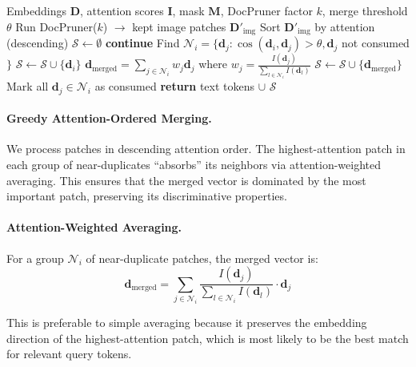 \documentclass[11pt]{article}
\begin{document}
\begin{algorithm}[t]
\caption{DP-PostMerge}
\begin{algorithmic}[1]
\REQUIRE Embeddings $\mathbf{D}$, attention scores $\mathbf{I}$, mask $\mathbf{M}$, DocPruner factor $k$, merge threshold $\theta$
\STATE Run DocPruner($k$) $\rightarrow$ kept image patches $\mathbf{D}'_{\text{img}}$
\STATE Sort $\mathbf{D}'_{\text{img}}$ by attention (descending)
\STATE $\mathcal{S} \leftarrow \emptyset$ 
    \STATE \textbf{continue}
  \ENDIF
  \STATE Find $\mathcal{N}_i = \{\mathbf{d}_j : \cos(\mathbf{d}_i, \mathbf{d}_j) > \theta, \mathbf{d}_j$ not consumed$\}$
    \STATE $\mathcal{S} \leftarrow \mathcal{S} \cup \{\mathbf{d}_i\}$ 
  \ELSE
    \STATE $\mathbf{d}_{\text{merged}} = \sum_{j \in \mathcal{N}_i} w_j \mathbf{d}_j$ where $w_j = \frac{I(\mathbf{d}_j)}{\sum_{l \in \mathcal{N}_i} I(\mathbf{d}_l)}$
    \STATE $\mathcal{S} \leftarrow \mathcal{S} \cup \{\mathbf{d}_{\text{merged}}\}$
  \ENDIF
  \STATE Mark all $\mathbf{d}_j \in \mathcal{N}_i$ as consumed
\ENDFOR
\STATE \textbf{return} text tokens $\cup$ $\mathcal{S}$
\end{algorithmic}
\end{algorithm}

\paragraph{Greedy Attention-Ordered Merging.}
We process patches in descending attention order.
The highest-attention patch in each group of near-duplicates ``absorbs'' its neighbors via attention-weighted averaging.
This ensures that the merged vector is dominated by the most important patch, preserving its discriminative properties.

\paragraph{Attention-Weighted Averaging.}
For a group $\mathcal{N}_i$ of near-duplicate patches, the merged vector is:
\begin{equation}
\mathbf{d}_{\text{merged}} = \sum_{j \in \mathcal{N}_i} \frac{I(\mathbf{d}_j)}{\sum_{l \in \mathcal{N}_i} I(\mathbf{d}_l)} \cdot \mathbf{d}_j
\end{equation}

This is preferable to simple averaging because it preserves the embedding direction of the highest-attention patch, which is most likely to be the best match for relevant query tokens.
\end{document}
